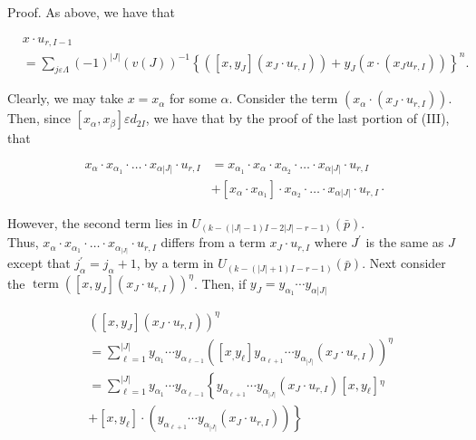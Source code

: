 \documentclass[10pt]{article}
\begin{document}
Proof. As above, we have that

$$
\begin{aligned}
& x \cdot u_{r, I-1} \\
& =\sum_{j \varepsilon \Lambda}(-1)^{|J|}(v(J))^{-1}\left\{\left(\left[x, y_{J}\right]\left(x_{J} \cdot u_{r, I}\right)\right)+y_{J}\left(x \cdot\left(x_{J} u_{r, I}\right)\right)\right\}^{n} .
\end{aligned}
$$

Clearly, we may take $x=x_{\alpha}$ for some $\alpha$. Consider the term $\left(x_{\alpha} \cdot\left(x_{J} \cdot u_{r, I}\right)\right)$. Then, since $\left[x_{\alpha}, x_{\beta}\right] \varepsilon d_{2 I}$, we have that by the proof of the last portion of (III), that

$$
\begin{aligned}
x_{\alpha} \cdot x_{\alpha_{1}} \cdot \ldots \cdot x_{\alpha|J|} \cdot u_{r, I} & =x_{\alpha_{1}} \cdot x_{\alpha} \cdot x_{\alpha_{2}} \cdot \ldots \cdot x_{\alpha|J|} \cdot u_{r, I} \\
& +\left[x_{\alpha} \cdot x_{\alpha_{1}}\right] \cdot x_{\alpha_{2}} \cdot \ldots \cdot x_{\alpha|J|} \cdot u_{r, I} \cdot
\end{aligned}
$$

However, the second term lies in $U_{(k-(|J|-1) I-2|J|-r-1)}(\bar{p})$.\\
Thus, $x_{\alpha} \cdot x_{\alpha_{1}} \cdot \ldots \cdot x_{\alpha_{|J|}} \cdot u_{r, I}$ differs from a term $x_{J} \cdot u_{r, I}$ where $J^{\prime}$ is the same as $J$ except that $j_{\alpha}^{\prime}=j_{\alpha}+1$, by a term in $U_{(k-(|J|+1) I-r-1)}(\bar{p})$. Next consider the $\operatorname{term}\left(\left[x, y_{J}\right]\left(x_{J} \cdot u_{r, I}\right)\right)^{\eta}$. Then, if $y_{J}=y_{\alpha_{1}} \cdots y_{\alpha|J|}$

$$
\begin{aligned}
& \left(\left[x, y_{J}\right]\left(x_{J} \cdot u_{r, I}\right)\right)^{\eta} \\
& =\sum_{\ell=1}^{|J|} y_{\alpha_{1}} \cdots y_{\alpha_{\ell-1}}\left(\left[x_{,} y_{\ell}\right] y_{\alpha_{\ell+1}} \cdots y_{\alpha_{|J|}}\left(x_{J} \cdot u_{r, I}\right)\right)^{\eta} \\
& =\sum_{\ell=1}^{|J|} y_{\alpha_{1}} \cdots y_{\alpha_{\ell-1}}\left\{y_{\alpha_{\ell+1}} \cdots y_{\alpha_{|J|}}\left(x_{J} \cdot u_{r, I}\right)\left[x, y_{\ell}\right]{ }^{\eta}\right. \\
& \left.+\left[x, y_{\ell}\right] \cdot\left(y_{\alpha_{\ell+1}} \cdots y_{\alpha_{|J|}}\left(x_{J} \cdot u_{r, I}\right)\right)\right\}
\end{aligned}
$$
\end{document}
